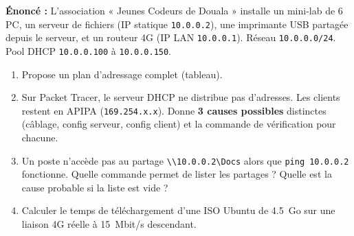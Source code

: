 \documentclass[11pt]{article}
\begin{document}
\begin{exercice}
\textbf{Énoncé :} L'association « Jeunes Codeurs de Douala » installe un mini-lab de 6 PC, un serveur de fichiers (IP statique \texttt{10.0.0.2}), une imprimante USB partagée depuis le serveur, et un routeur 4G (IP LAN \texttt{10.0.0.1}). Réseau \texttt{10.0.0.0/24}. Pool DHCP \texttt{10.0.0.100} à \texttt{10.0.0.150}.
\begin{enumerate}
\item Propose un plan d'adressage complet (tableau).
\item Sur Packet Tracer, le serveur DHCP ne distribue pas d'adresses. Les clients restent en APIPA (\texttt{169.254.x.x}). Donne \textbf{3 causes possibles} distinctes (câblage, config serveur, config client) et la commande de vérification pour chacune.
\item Un poste n'accède pas au partage \texttt{\textbackslash\textbackslash 10.0.0.2\textbackslash Docs} alors que \texttt{ping 10.0.0.2} fonctionne. Quelle commande permet de lister les partages ? Quelle est la cause probable si la liste est vide ?
\item Calculer le temps de téléchargement d'une ISO Ubuntu de \SI{4,5}{Go} sur une liaison 4G réelle à \SI{15}{Mbit/s} descendant.
\end{enumerate}
\end{exercice}
\end{document}
